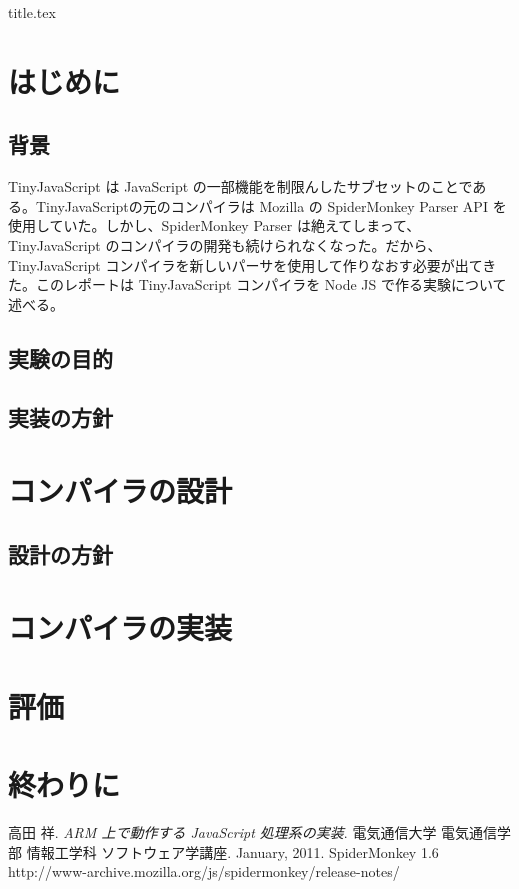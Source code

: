 \documentclass[12pt]{article}
\begin{document}
 {title.tex}

\tableofcontents

\newpage
{}

\section{はじめに}
\subsection{背景}
TinyJavaScript は JavaScript の一部機能を制限んしたサブセットのことである\cite{jscompiler}。TinyJavaScriptの元のコンパイラは Mozilla の SpiderMonkey Parser API \cite{spidermonkey}を使用していた。しかし、SpiderMonkey Parser は絶えてしまって、TinyJavaScript のコンパイラの開発も続けられなくなった。だから、TinyJavaScript コンパイラを新しいパーサを使用して作りなおす必要が出てきた。このレポートは TinyJavaScript コンパイラを Node JS で作る実験について述べる。

\subsection{実験の目的}
\subsection{実装の方針}

\section{コンパイラの設計}
\subsection{設計の方針}

\section{コンパイラの実装}

\section{評価}

\section{終わりに}

\newpage
\begin{thebibliography}{9}
高田 祥. \textit{ARM 上で動作する JavaScript 処理系の実装}. 電気通信大学 電気通信学部
情報工学科 ソフトウェア学講座. January, 2011.
SpiderMonkey 1.6 \newline
http://www-archive.mozilla.org/js/spidermonkey/release-notes/
\end{thebibliography}
\end{document}
